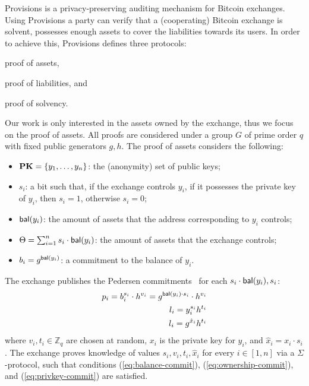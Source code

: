 Provisions is a privacy-preserving auditing mechanism for Bitcoin exchanges.
Using Provisions a party can verify that a (cooperating) Bitcoin exchange is
solvent, \ie possesses enough assets to cover the liabilities towards its
users. In order to achieve this, Provisions defines three protocols:
\begin{inparaenum}[i)]
    \item proof of assets,
    \item proof of liabilities, and
    \item proof of solvency.
\end{inparaenum}
Our work is only interested in the assets owned by the exchange, thus we focus
on the proof of assets. All proofs are considered under a group $G$ of prime
order $q$ with fixed public generators $g, h$. The proof of assets considers
the following:
\begin{itemize}
    \item $\text{\textbf{PK}} = \{y_1, \dots, y_n \}$: the (anonymity) set of public keys;
    \item $s_i$: a bit such that, if the exchange controls $y_i$, \ie if it possesses the private key of $y_i$, then $s_i = 1$, otherwise $s_i = 0$;
    \item $\mathsf{bal}(y_i)$: the amount of assets that the address corresponding to $y_i$ controls;
    \item $\Theta = \sum_{i = 1}^n s_i \cdot \mathsf{bal}(y_i)$: the amount of assets that the exchange controls;
    \item $b_i = g^{\mathsf{bal}(y_i)}$: a commitment to the balance of $y_i$.
\end{itemize}
The exchange publishes the Pedersen commitments~\cite{C:Pedersen91} for each $s_i \cdot
\mathsf{bal}(y_i), s_i$:
\begin{align}
    p_i = b_i^{s_i} \cdot h^{v_i} = g^{\mathsf{bal}(y_i) \cdot s_i} \cdot h^{v_i} \label{eq:balance-commit} \\
    l_i = y_i^{s_i}h^{t_i} \label{eq:ownership-commit} \\
    l_i = g^{\hat{x}_i}h^{t_i} \label{eq:privkey-commit}
\end{align}
where $v_i, t_i \in \mathbb{Z}_q$ are chosen at random,
$x_i$ is the private key for $y_i$, and $\hat{x}_i = x_i \cdot s_i$.
The exchange proves knowledge of values $s_i, v_i, t_i, \hat{x}_i$ for every $i
\in [1, n]$ via a $\Sigma$-protocol, such that conditions
(\ref{eq:balance-commit}), (\ref{eq:ownership-commit}), and
(\ref{eq:privkey-commit}) are satisfied.

